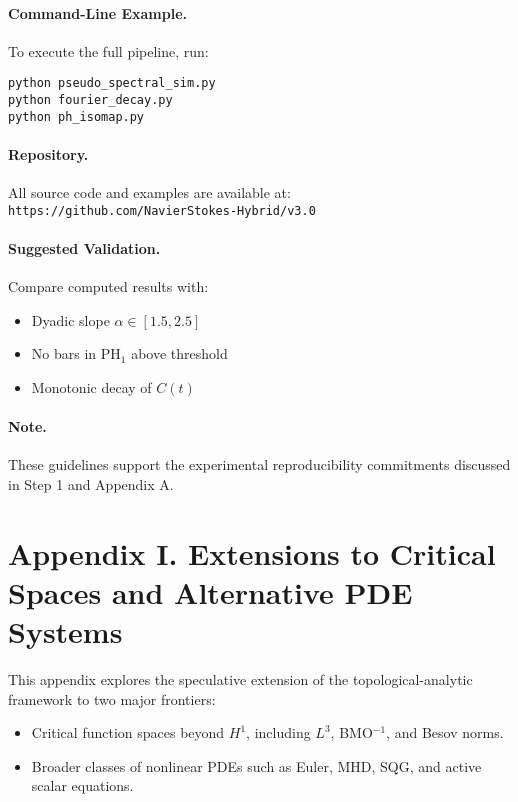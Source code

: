 \documentclass[11pt]{article}
\theoremstyle{definition}
\begin{document}
\paragraph{Command-Line Example.}
To execute the full pipeline, run:
\begin{verbatim}
python pseudo_spectral_sim.py
python fourier_decay.py
python ph_isomap.py
\end{verbatim}

\paragraph{Repository.}
All source code and examples are available at: \texttt{https://github.com/NavierStokes-Hybrid/v3.0}

\paragraph{Suggested Validation.}
Compare computed results with:
\begin{itemize}
  \item Dyadic slope \( \alpha \in [1.5, 2.5] \)
  \item No bars in \( \mathrm{PH}_1 \) above threshold
  \item Monotonic decay of \( C(t) \)
\end{itemize}

\paragraph{Note.} These guidelines support the experimental reproducibility commitments discussed in Step 1 and Appendix A.


\section*{Appendix I. Extensions to Critical Spaces and Alternative PDE Systems}

This appendix explores the speculative extension of the topological-analytic framework to two major frontiers:

\begin{itemize}
  \item Critical function spaces beyond $H^1$, including $L^3$, BMO$^{-1}$, and Besov norms.
  \item Broader classes of nonlinear PDEs such as Euler, MHD, SQG, and active scalar equations.
\end{itemize}
\end{document}
